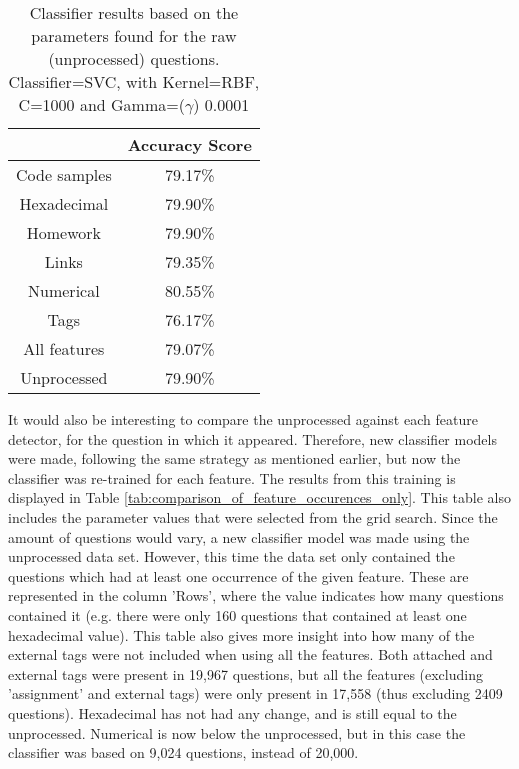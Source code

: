 \begin{table}[!h]%
	\centering
	\begin{tabular}{| c | c |}
		\hline
		~ 				& Accuracy Score	\\ \hline
		Code samples 	& 79.17\%			\\ \hline
		Hexadecimal		& 79.90\%			\\ \hline
		Homework 		& 79.90\%			\\ \hline
		Links			& 79.35\%			\\ \hline				
		Numerical		& 80.55\%			\\ \hline
		Tags			& 76.17\%			\\ \hline
		All features	& 79.07\%			\\ \hline
		Unprocessed		& 79.90\%			\\ \hline
	\end{tabular}
	\caption{Classifier results based on the parameters found for the raw (unprocessed) questions. Classifier=SVC, with Kernel=RBF, C=1000 and Gamma=($\gamma$) 0.0001}	
	\label{tab:singular_feature_detector_so}
\end{table}
\vspace{0.5em}\newline
It would also be interesting to compare the unprocessed against each feature detector, for the question in which it appeared.
Therefore, new classifier models were made, following the same strategy as mentioned earlier, but now the classifier was re-trained for each feature.
The results from this training is displayed in Table \ref{tab:comparison_of_feature_occurences_only}.
This table also includes the parameter values that were selected from the grid search. 
Since the amount of questions would vary, a new classifier model was made using the unprocessed data set. 
However, this time the data set only contained the questions which had at least one occurrence of the given feature. 
These are represented in the column 'Rows', where the value indicates how many questions contained it (e.g. there were only 160 questions that contained at least one hexadecimal value).
This table also gives more insight into how many of the external tags were not included when using all the features. 
Both attached and external tags were present in 19,967 questions, but all the features (excluding 'assignment' and external tags) were only present in 17,558 (thus excluding 2409 questions).
Hexadecimal has not had any change, and is still equal to the unprocessed.
Numerical is now below the unprocessed, but in this case the classifier was based on 9,024 questions, instead of 20,000.
